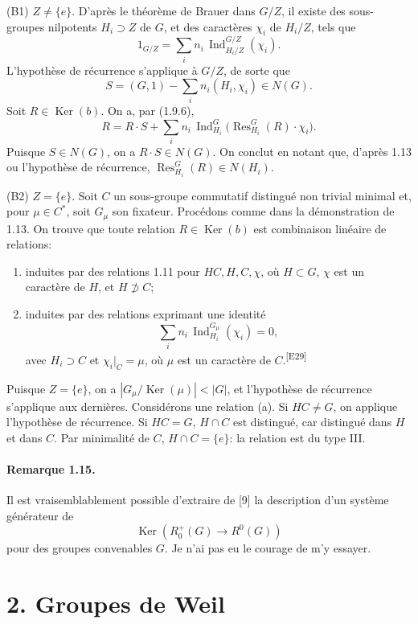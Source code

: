 \documentclass[10pt,letterpaper]{article}
\newcommand{\Ind}{\operatorname{Ind}}
\newcommand{\Res}{\operatorname{Res}}
\providecommand{\Ker}{\operatorname{Ker}}
\providecommand{\Ind}{\operatorname{Ind}}
\providecommand{\Ker}{\operatorname{Ker}}
\newcommand{\auditmark}[1]{\textsuperscript{\normalfont\scriptsize[E#1]}}
\begin{document}
(B1) \(Z\ne\{e\}\). D'après le théorème de Brauer dans \(G/Z\), il existe des sous-groupes nilpotents \(H_i\supset Z\) de \(G\), et des caractères \(\chi_i\) de \(H_i/Z\), tels que
\[
1_{G/Z}=\sum_i n_i\,\Ind_{H_i/Z}^{G/Z}(\chi_i).
\]
L'hypothèse de récurrence s'applique à \(G/Z\), de sorte que
\[
S=(G,1)-\sum_i n_i(H_i,\chi_i)\in N(G).
\]
Soit \(R\in\Ker(b)\). On a, par (1.9.6),
\[
R=R\cdot S+\sum_i n_i\,\Ind_{H_i}^G\bigl(\Res_{H_i}^G(R)\cdot\chi_i\bigr).
\]
Puisque \(S\in N(G)\), on a \(R\cdot S\in N(G)\). On conclut en notant que, d'après 1.13 ou l'hypothèse de récurrence, \(\Res_{H_i}^G(R)\in N(H_i)\).

(B2) \(Z=\{e\}\). Soit \(C\) un sous-groupe commutatif distingué non trivial minimal et, pour \(\mu\in C^*\), soit \(G_\mu\) son fixateur. Procédons comme dans la démonstration de 1.13. On trouve que toute relation \(R\in\Ker(b)\) est combinaison linéaire de relations:
\begin{enumerate}[label=(\alph*)]
\item induites par des relations 1.11 pour \(HC,H,C,\chi\), où \(H\subset G\), \(\chi\) est un caractère de \(H\), et \(H\not\supset C\);
\item induites par des relations exprimant une identité
\[
\sum_i n_i\,\Ind_{H_i}^{G_\mu}(\chi_i)=0,
\]
avec \(H_i\supset C\) et \(\chi_i|_C=\mu\), où \(\mu\) est un caractère de \(C\).\auditmark{29}
\end{enumerate}
Puisque \(Z=\{e\}\), on a \(|G_\mu/\Ker(\mu)|<|G|\), et l'hypothèse de récurrence s'applique aux dernières. Considérons une relation (a). Si \(HC\ne G\), on applique l'hypothèse de récurrence. Si \(HC=G\), \(H\cap C\) est distingué, car distingué dans \(H\) et dans \(C\). Par minimalité de \(C\), \(H\cap C=\{e\}\): la relation est du type III.

\paragraph{Remarque 1.15.} Il est vraisemblablement possible d'extraire de [9] la description d'un système générateur de
\[
\Ker(R^+_0(G)\longrightarrow R^0(G))
\]
pour des groupes convenables \(G\). Je n'ai pas eu le courage de m'y essayer.

\section*{2. Groupes de Weil}
\end{document}
